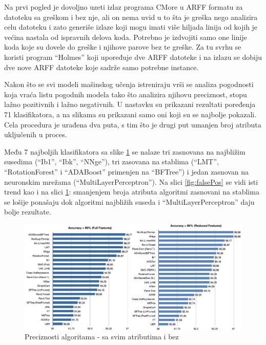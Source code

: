 \documentclass[a4paper]{article}
\begin{document}
Na prvi pogled je dovoljno uzeti izlaz programa CMore u ARFF formatu za datoteku sa greškom i bez nje, ali on nema uvid u to šta je greška nego analizira celu datoteku i zato
generiše izlaze koji mogu imati više hiljada linija od kojih je većina nastala od ispravnih delova koda.
Potrebno je izdvojiti samo one linije koda koje su dovele do greške i njihove parove bez te greške.
Za tu svrhu se koristi program ``Holmes'' koji upoređuje dve ARFF datoteke i na izlazu se dobiju dve nove ARFF datoteke koje sadrže samo potrebne  instance.

Nakon što se svi modeli mašinskog učenja istreniraju vrši se analiza pogodnosti
koja vraća listu pogodnih modela tako što analizira njihovu preciznost, stopu lažno pozitivnih i lažno negativnih.
U nastavku su prikazani rezultati poređenja 71 klasifikatora, a na slikama su prikazani samo oni koji su se najbolje pokazali. Cela procedura je urađena dva puta, s tim što je drugi put umanjen broj atributa uključenih u proces.

Među 7 najboljih klasifikatora sa slike \ref{fig:acc} se nalaze tri zasnovana na najbližim susedima (``Ib1'', ``Ibk'', ``NNge''), tri zasovana na stablima
(``LMT'', ``RotationForest'' i ``ADABoost'' primenjen na ``BFTree'') i jedan zasnovan na neuronskim mrežama (``MultiLayerPerceptron'').
Na slici  \ref{fig:falsePos} se vidi isti trend kao i na slici  \ref{fig:acc}: smanjenjem broja atributa algoritmi zasnovani na stablima se lošije ponašaju dok algoritmi najbližih suseda i ``MultiLayerPerceptron'' daju bolje rezultate.

\begin{figure}[h!]
\centering
\includegraphics[width=\textwidth]{accuracy.png}
\caption{Preciznosti algoritama - sa svim atributima i bez}
\label{fig:acc}
\end{figure}
\end{document}
